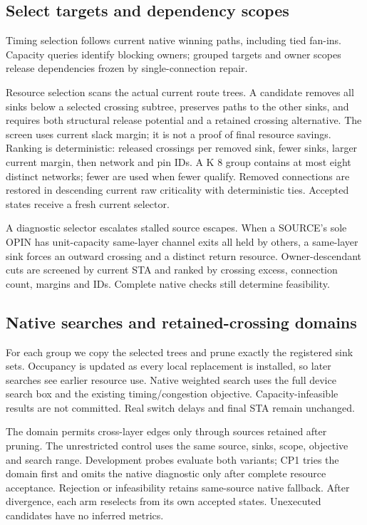 \documentclass[conference,10pt]{IEEEtran}
\begin{document}
\subsection{Select targets and dependency scopes}
Timing selection follows current native winning paths, including tied fan-ins. Capacity queries identify blocking owners; grouped targets and owner scopes release dependencies frozen by single-connection repair.

Resource selection scans the actual current route trees. A candidate removes all sinks below a selected crossing subtree, preserves paths to the other sinks, and requires both structural release potential and a retained crossing alternative. The screen uses current slack margin; it is not a proof of final resource savings. Ranking is deterministic: released crossings per removed sink, fewer sinks, larger current margin, then network and pin IDs. A K 8 group contains at most eight distinct networks; fewer are used when fewer qualify. Removed connections are restored in descending current raw criticality with deterministic ties. Accepted states receive a fresh current selector.

A diagnostic selector escalates stalled source escapes. When a SOURCE's sole OPIN has unit-capacity same-layer channel exits all held by others, a same-layer sink forces an outward crossing and a distinct return resource. Owner-descendant cuts are screened by current STA and ranked by crossing excess, connection count, margins and IDs. Complete native checks still determine feasibility.

\subsection{Native searches and retained-crossing domains}
For each group we copy the selected trees and prune exactly the registered sink sets. Occupancy is updated as every local replacement is installed, so later searches see earlier resource use. Native weighted search uses the full device search box and the existing timing/congestion objective. Capacity-infeasible results are not committed. Real switch delays and final STA remain unchanged.

The domain permits cross-layer edges only through sources retained after pruning. The unrestricted control uses the same source, sinks, scope, objective and search range. Development probes evaluate both variants; CP1 tries the domain first and omits the native diagnostic only after complete resource acceptance. Rejection or infeasibility retains same-source native fallback. After divergence, each arm reselects from its own accepted states. Unexecuted candidates have no inferred metrics.
\end{document}
